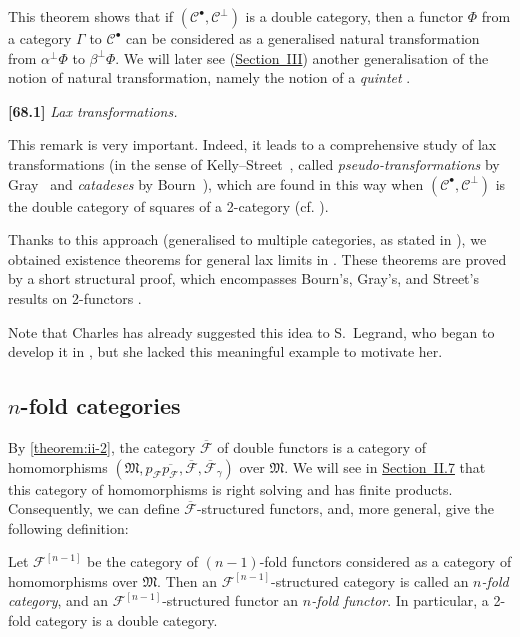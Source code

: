 \documentclass[a4paper,fleqn]{article}
\theoremstyle{plain}
\theoremstyle{definition}
\newenvironment{definition}[1]
  {\renewcommand\theinnerdefinition{#1}\innerdefinition}
  {\endinnerdefinition}
\newenvironment{longcomm}[1]
  {\noindent\textbf{[#1]}\rmfamily}
  {}
\newcommand{\CC}{\mathcal{C}}
\newcommand{\MM}{\mathfrak{M}}
\newcommand{\FF}{\mathcal{F}}
\begin{document}
This theorem shows that if $(\CC^\bullet,\CC^\perp)$ is a double category, then a functor $\Phi$ from a category $\Gamma$ to $\CC^\bullet$ can be considered as a generalised natural transformation from $\alpha^\perp\Phi$ to $\beta^\perp\Phi$.
We will later see (\hyperref[section:iii]{Section~III}) another generalisation of the notion of natural transformation, namely the notion of a \emph{quintet} \cite{3e}.

\begin{longcomm}{68.1}
  \emph{Lax transformations.}

  This remark is very important.
  Indeed, it leads to a comprehensive study of lax transformations (in the sense of Kelly--Street~\cite{comm59}, called \emph{pseudo-transformations} by Gray~\cite{comm40} and \emph{catadeses} by Bourn~\cite{comm14}), which are found in this way when $(\CC^\bullet,\CC^\perp)$ is the double category of squares of a 2-category (cf. \cite[Comment~105.1]{coll64}).

  Thanks to this approach (generalised to multiple categories, as stated in \cite[Remark~3, p.~399]{coll117}), we obtained existence theorems for general lax limits in \cite{coll119,coll121}.
  These theorems are proved by a short structural proof, which encompasses Bourn's, Gray's, and Street's results on 2-functors \cite{comm14,comm40,comm92}.

  Note that Charles has already suggested this idea to S.~Legrand, who began to develop it in \cite{comm67}, but she lacked this meaningful example to motivate her.
\end{longcomm}


\subsection{$n$-fold categories}
\label{section:ii-5}

By \cref{theorem:ii-2}, the category $\overline{\FF}$ of double functors is a category of homomorphisms $(\MM,p_\FF\overline{p_\FF},\overline{\FF},\overline{\FF}_\gamma)$ over $\MM$.
We will see in \hyperref[section:ii-7]{Section~II.7} that this category of homomorphisms is right solving and has finite products.
Consequently, we can define $\overline{\FF}$-structured functors, and, more general, give the following definition:

\begin{definition}{15}
\label{definition:ii-15}
  Let $\FF^{[n-1]}$ be the category of $(n-1)$-fold functors considered as a category of homomorphisms over $\MM$.
  Then an $\FF^{[n-1]}$-structured category is called an \emph{$n$-fold category}, and an $\FF^{[n-1]}$-structured functor an \emph{$n$-fold functor}.
  In particular, a 2-fold category is a double category.
\end{definition}
\end{document}
